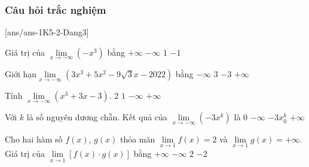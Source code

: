 \subsubsection{Câu hỏi trắc nghiệm}
[ans/ans-1K5-2-Dang3]
\begin{ex}%
	Giá trị của $\lim\limits_{x\to -\infty}(-x^3)$ bằng
	\choice
	{\True $+\infty$}
	{$-\infty$}
	{$1$}
	{$-1$}
\end{ex}
\begin{ex}%
	Giới hạn$\lim\limits_{x\to -\infty} \left(3x^3+5x^2-9\sqrt {3}x-2022 \right)$ bằng
	\choice
	{\True $-\infty $}
	{$3$}
	{$-3$}
	{$+\infty $}
\end{ex}
\begin{ex}%
	Tính $\lim\limits_{x\to -\infty } ( x^3+3x-3 )$.
	\choice
	{$2$}
	{$1$}
	{\True $-\infty $}
	{$+\infty $}
\end{ex}
\begin{ex}%
	Với $ k$ là số nguyên dương chẵn. Kết quả của $\lim\limits_{x\to -\infty } \left(-3x^k \right)$ là
	\choice
	{$0$}
	{\True $-\infty $}
	{$-3x_0^k$}
	{$+\infty $}
\end{ex}
\begin{ex}%
	Cho hai hàm số $ f(x)$, $g(x)$ thỏa mãn $\lim\limits_{x\to 1} f(x)=2$ và $\lim\limits_{x\to 1} g(x)=+\infty $. Giá trị của $\lim\limits_{x\to 1} [ f(x)\cdot g(x)]$ bằng
	\choice
	{\True $+\infty $}
	{$-\infty $}
	{$2$}
	{$-2$}
\end{ex}
